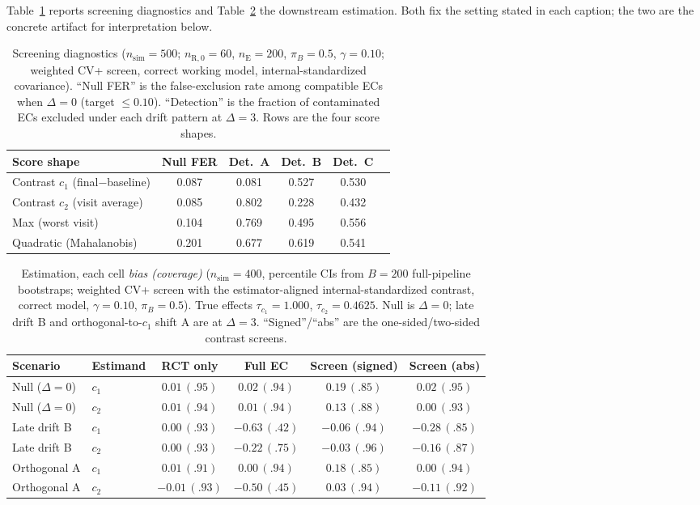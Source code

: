 \documentclass[11pt]{article}
\newcommand{\R}{\mathrm{R}}
\newcommand{\E}{\mathrm{E}}
\begin{document}
Table~\ref{tab:diagplaceholder} reports screening diagnostics and Table~\ref{tab:estplaceholder} the downstream estimation. Both fix the setting stated in each caption; the two are the concrete artifact for interpretation below.

\begin{table}[ht]
\centering
\caption{Screening diagnostics ($n_{\mathrm{sim}}=500$; $n_{\R,0}=60$, $n_{\E}=200$, $\pi_B=0.5$, $\gamma=0.10$; weighted CV+ screen, correct working model, internal-standardized covariance). ``Null FER'' is the false-exclusion rate among compatible ECs when $\Delta=0$ (target $\le 0.10$). ``Detection'' is the fraction of contaminated ECs excluded under each drift pattern at $\Delta=3$. Rows are the four score shapes.}
\begin{tabular}{lccccc}
\toprule
Score shape & Null FER & Det.\ A & Det.\ B & Det.\ C \\
\midrule
Contrast $c_1$ (final$-$baseline) & 0.087 & 0.081 & 0.527 & 0.530 \\
Contrast $c_2$ (visit average)    & 0.085 & 0.802 & 0.228 & 0.432 \\
Max (worst visit)                 & 0.104 & 0.769 & 0.495 & 0.556 \\
Quadratic (Mahalanobis)           & 0.201 & 0.677 & 0.619 & 0.541 \\
\bottomrule
\end{tabular}
\label{tab:diagplaceholder}
\end{table}

\begin{table}[ht]
\centering
\caption{Estimation, each cell \emph{bias (coverage)} ($n_{\mathrm{sim}}=400$, percentile CIs from $B=200$ full-pipeline bootstraps; weighted CV+ screen with the estimator-aligned internal-standardized contrast, correct model, $\gamma=0.10$, $\pi_B=0.5$). True effects $\tau_{c_1}=1.000$, $\tau_{c_2}=0.4625$. Null is $\Delta=0$; late drift B and orthogonal-to-$c_1$ shift A are at $\Delta=3$. ``Signed''/``abs'' are the one-sided/two-sided contrast screens.}
\begin{tabular}{llcccc}
\toprule
Scenario & Estimand & RCT only & Full EC & Screen (signed) & Screen (abs) \\
\midrule
Null ($\Delta{=}0$) & $c_1$ & $0.01\,(.95)$ & $0.02\,(.94)$ & $0.19\,(.85)$ & $0.02\,(.95)$ \\
Null ($\Delta{=}0$) & $c_2$ & $0.01\,(.94)$ & $0.01\,(.94)$ & $0.13\,(.88)$ & $0.00\,(.93)$ \\
Late drift B & $c_1$ & $0.00\,(.93)$ & $-0.63\,(.42)$ & $-0.06\,(.94)$ & $-0.28\,(.85)$ \\
Late drift B & $c_2$ & $0.00\,(.93)$ & $-0.22\,(.75)$ & $-0.03\,(.96)$ & $-0.16\,(.87)$ \\
Orthogonal A & $c_1$ & $0.01\,(.91)$ & $0.00\,(.94)$ & $0.18\,(.85)$ & $0.00\,(.94)$ \\
Orthogonal A & $c_2$ & $-0.01\,(.93)$ & $-0.50\,(.45)$ & $0.03\,(.94)$ & $-0.11\,(.92)$ \\
\bottomrule
\end{tabular}
\label{tab:estplaceholder}
\end{table}
\end{document}

